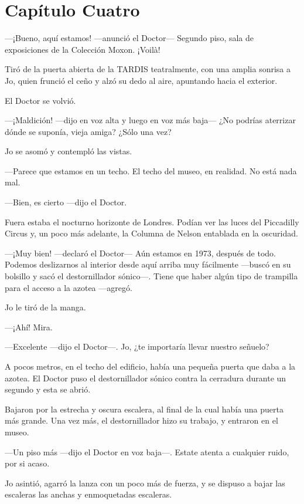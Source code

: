 \chapter*{Capítulo Cuatro}

---¡Bueno, aquí estamos! ---anunció el Doctor--- Segundo piso, sala de
exposiciones de la Colección Moxon. ¡Voilà!

Tiró de la puerta abierta de la TARDIS teatralmente, con una amplia
sonrisa a Jo, quien frunció el ceño y alzó su dedo al aire, apuntando
hacia el exterior.

El Doctor se volvió.

---¡Maldición! ---dijo en voz alta y luego en voz más baja--- ¿No
podrías aterrizar dónde se suponía, vieja amiga? ¿Sólo una vez?

Jo se asomó y contempló las vistas.

---Parece que estamos en un techo. El techo del museo, en realidad. No
está nada mal.

---Bien, es cierto ---dijo el Doctor.

Fuera estaba el nocturno horizonte de Londres. Podían ver las luces del
Piccadilly Circus y, un poco más adelante, la Columna de Nelson
entablada en la oscuridad.

---¡Muy bien! ---declaró el Doctor--- Aún estamos en 1973, después de
todo. Podemos deslizarnos al interior desde aquí arriba muy fácilmente
---buscó en su bolsillo y sacó el destornillador sónico---. Tiene que
haber algún tipo de trampilla para el acceso a la azotea ---agregó.

Jo le tiró de la manga.

---¡Ahí! Mira.

---Excelente ---dijo el Doctor---. Jo, ¿te importaría llevar nuestro
señuelo?

A pocos metros, en el techo del edificio, había una pequeña puerta que
daba a la azotea. El Doctor puso el destornillador sónico contra la
cerradura durante un segundo y esta se abrió.

Bajaron por la estrecha y oscura escalera, al final de la cual había una
puerta más grande. Una vez más, el destornillador hizo su trabajo, y
entraron en el museo.

---Un piso más ---dijo el Doctor en voz baja---. Estate atenta a
cualquier ruido, por si acaso.

Jo asintió, agarró la lanza con un poco más de fuerza, y se dispuso a
bajar las escaleras las anchas y enmoquetadas escaleras.

